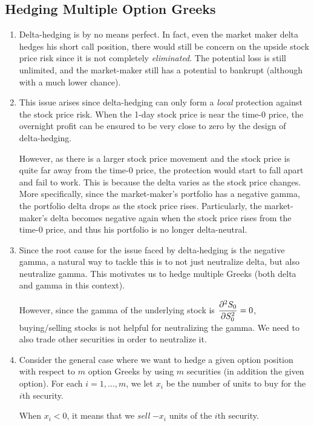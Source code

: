 \subsection{Hedging Multiple Option Greeks}
\label{subsect:hedge-multiple-greeks}
\begin{enumerate}
\item Delta-hedging is by no means perfect. In fact, even the market maker
delta hedges his short call position, there would still be concern on the
upside stock price risk since it is not completely \emph{eliminated}. The
potential loss is still unlimited, and the market-maker still has a potential
to bankrupt (although with a much lower chance).

\item This issue arises since delta-hedging can only form a \emph{local} protection
against the stock price risk. When the 1-day stock price is near the time-0
price, the overnight profit can be ensured to be very close to zero by the
design of delta-hedging.

However, as there is a larger stock price movement and the stock price is quite
far away from the time-0 price, the protection would start to fall apart and
fail to work. This is because the delta varies as the stock price changes. More
specifically, since the market-maker's portfolio has a negative gamma, the
portfolio delta drops as the stock price rises. Particularly, the
market-maker's delta becomes negative again when the stock price rises from the
time-0 price, and thus his portfolio is no longer delta-neutral.

\item Since the root cause for the issue faced by delta-hedging is the negative
gamma, a natural way to tackle this is to not just neutralize delta, but also
neutralize gamma. This motivates us to hedge multiple Greeks (both delta and
gamma in this context).

However, since the gamma of the underlying stock is \(\displaystyle
\pdv[2]{S_0}{S_0}=0\), buying/selling stocks is not helpful for neutralizing
the gamma. We need to also trade other securities in order to neutralize it.

\item \label{it:hedge-multiple-greeks-method}
Consider the general case where we want to hedge a given option position
with respect to \(m\) option Greeks by using \(m\) securities (in addition the
given option). For each \(i=1,\dotsc,m\), we let \(x_i\) be the number of units
to buy for the \(i\)th security. \begin{note}
When \(x_i<0\), it means that we \emph{sell} \(-x_i\) units of the \(i\)th security.
\end{note}


\end{enumerate}
